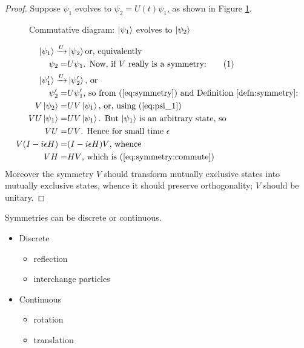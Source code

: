 \documentclass[]{article}
\newcommand\numberthis{\addtocounter{equation}{1}\tag{\theequation}}
\begin{document}
\begin{proof}
	Suppose $\psi_1$ evolves to $\psi_2=U(t)\psi_1$, as shown in Figure \ref{fig:commutator}.
	\begin{figure}[H]
		\begin{center}
			\caption{Commutative diagram: $\ket{\psi_1}$ evolves to $\ket{\psi_2}$}\label{fig:commutator}
		\end{center}
	\end{figure}
	\begin{align*}
		\ket{\psi_1} \xrightarrow{U}& \ket{\psi_2} \text {or, equivalently}\\
		\psi_2 =& U \psi_1 \text{. Now, if $V$ really is a symmetry:} \numberthis \label{eq:psi_1}\\
		\ket{\psi_1^{\prime}} \xrightarrow{U}& \ket{\psi_2^{\prime}} \text {,  or}\\
		\psi_2^{\prime} =& U \psi_1^{\prime} \text{, so from (\ref{eq:symmetry}) and Definition \ref{defn:symmetry}:} \\
		V\ket{\psi_2} =& U V \ket{\psi_1} \text{, or, using (\ref{eq:psi_1})}\\
		V U\ket {\psi_1} =& U V \ket{\psi_1} \text{. But $\ket{\psi_1}$ is an arbitrary state, so} \\
		V U =& U V \text{. Hence for small time $\epsilon$}\\
		V (I - i \epsilon H) =& (I - i \epsilon H) V \text{, whence}\\
		V H =& H V \text{, which is (\ref{eq:symmetry:commute})}
	\end{align*}
	Moreover the symmetry $V$ should transform mutually exclusive states into mutually exclusive states, whence it should preserve orthogonality; $V$ should be unitary. 
\end{proof}

Symmetries can be discrete or continuous.

\begin{itemize}
	\item Discrete
	\begin{itemize}
		\item reflection
		\item interchange particles
	\end{itemize}
	\item Continuous
	\begin{itemize}
		\item rotation
		\item translation
	\end{itemize}
\end{itemize}
\end{document}
